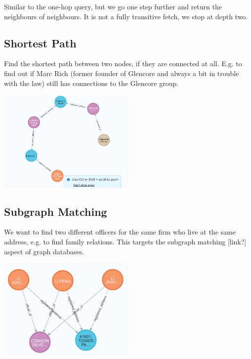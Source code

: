 \documentclass[11pt, a4paper,oneside,chapterprefix=false]{scrbook}
\begin{document}
Similar to the one-hop query, but we go one step further and return the neighbours of neighbours.
It is not a fully transitive fetch, we stop at depth two.

\subsection{Shortest Path}

Find the shortest path between two nodes, if they are connected at all. E.g. to find out if Marc Rich (former founder of Glencore and always a bit in trouble with the law) still has connections to the Glencore group.

\includegraphics*[width=0.5\textwidth]{figures/query_shortest_path.png} \hfill

\subsection{Subgraph Matching}

We want to find two different officers for the same firm who live at the same address, e.g. to find family relations.
This targets the subgraph matching [link?] aspect of graph databases.

\includegraphics*[width=0.5\textwidth]{figures/query_relation.png} \hfill


%
%
\end{document}
